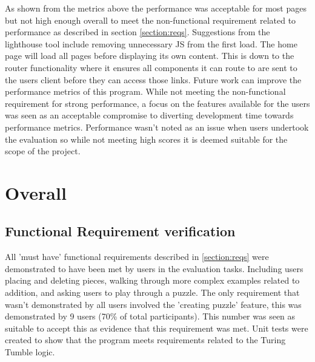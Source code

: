 \documentclass{l4proj}
\begin{document}
As shown from the metrics above the performance was acceptable for most pages but not high enough overall to meet the non-functional requirement related to performance as described in section \ref{section:reqs}. Suggestions from the lighthouse tool include removing unnecessary JS from the first load. The home page will load all pages before displaying its own content. This is down to the router functionality where it ensures all components it can route to are sent to the users client before they can access those links. Future work can improve the performance metrics of this program. While not meeting the non-functional requirement for strong performance, a focus on the features available for the users was seen as an acceptable compromise to diverting development time towards performance metrics. Performance wasn't noted as an issue when users undertook the evaluation so while not meeting high scores it is deemed suitable for the scope of the project. 


\section{Overall}
\subsection{Functional Requirement verification}

All 'must have' functional requirements described in \ref{section:reqs} were demonstrated to have been met by users in the evaluation tasks. Including users placing and deleting pieces, walking through more complex examples related to addition, and asking users to play through a puzzle. The only requirement that wasn't demonstrated by all users involved the 'creating puzzle' feature, this was demonstrated by 9 users (70\% of total participants). This number was seen as suitable to accept this as evidence that this requirement was met. Unit tests were created to show that the program meets requirements related to the Turing Tumble logic.
\end{document}
